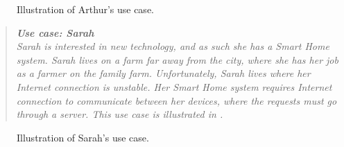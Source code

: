 \begin{figure}[H]
     \caption{\label{fig:use-case-2} Illustration of Arthur's use case.}
\end{figure}


\begin{quotation}\emph{\textbf{Use case: Sarah}\\
Sarah is interested in new technology, and as such she has a Smart Home system. Sarah lives on a farm far away from the city, where she has her job as a farmer on the family farm. Unfortunately, Sarah lives where her Internet connection is unstable. Her Smart Home system requires Internet connection to communicate between her devices, where the requests must go through a server. This use case is illustrated in .}
\end{quotation}

\begin{figure}[H]
     \caption{\label{fig:use-case-3} Illustration of Sarah's use case.}
\end{figure}